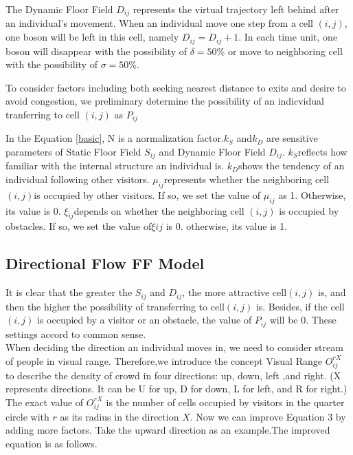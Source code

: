 \documentclass{mcmthesis}
\begin{document}
The Dynamic Floor Field $D_{ij}$ represents the virtual trajectory left behind after an individual's movement. When an individual move one step from a cell $(i,j)$, one boson will be left in this cell, namely $D_{ij}=D_{ij}+1$. In each time unit, one boson will disappear with the possibility of $\delta=50\%$ or move to neighboring cell with the possibility of $\sigma=50\%$.

To consider factors including both seeking nearest distance to exits and desire to avoid congestion, we preliminary determine the possibility of an indicvidual tranferring to cell $(i, j)$ as $P_{ij}$

In the Equation \eqref{basic}, N is a normalization factor.$k_{S}$ and$ k_{D}$ are sensitive parameters of Static Floor Field $S_{ij}$ and Dynamic Floor Field $D_{ij}$. $k_{S} $reflects how familiar with the internal structure an individual is. $k_{D} $shows the tendency of an individual following other visitors. $\mu_{ij} $represents whether the neighboring cell $(i, j) $is occupied by other visitors. If so, we set the value of $\mu_{ij}$ as 1. Otherwise, its value is 0. $\xi_{ij}$depends on whether the neighboring cell $(i, j)$ is occupied by obstacles. If so, we set the value of$ \xi{ij}$ is 0. otherwise, its value is 1.




\subsection{Directional Flow FF Model}
It is clear that the greater the $S_{ij}$ and $D_{ij}$, the more attractive cell$ (i, j)$ is, and then the higher the possibility of transferring to cell$ (i, j)$ is. Besides, if the cell$ (i, j)$ is occupied by a visitor or an obstacle, the value of $P_{ij}$ will be $0$. These settings accord to common sense.\\
When deciding the direction an individual moves in, we need to consider stream of people in visual range. Therefore,we introduce the concept Visual Range $O_{ij}^{rX}$ to describe the density of crowd in four directions: up, down, left ,and right. (X represents directions. It can be U for up, D for down, L for left, and R for right.) The exact value of $O_{ij}^{rX}$ is the number of cells occupied by visitors in the quarter circle with $r$ as its radius in the direction $X$. Now we can improve Equation 3 by adding more factors. Take the upward direction as an example.The improved equation is as follows.
\end{document}
